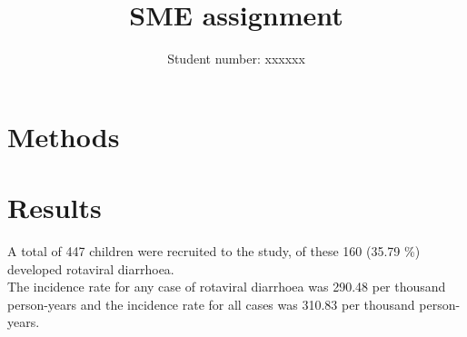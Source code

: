 \documentclass[11pt,a4paper,twoside]{article}\usepackage{graphicx, color}
\title{SME assignment}
\author{Student number: xxxxxx}
\makeatletter
\newenvironment{kframe}{%
 \def\at@end@of@kframe{}%
 \ifinner\ifhmode%
  \def\at@end@of@kframe{\end{minipage}}%
  \begin{minipage}{\columnwidth}%
 \fi\fi%
 \def\FrameCommand##1{\hskip\@totalleftmargin \hskip-\fboxsep
 \colorbox{shadecolor}{##1}\hskip-\fboxsep
     \hskip-\linewidth \hskip-\@totalleftmargin \hskip\columnwidth}%
 \MakeFramed {\advance\hsize-\width
   \@totalleftmargin\z@ \linewidth\hsize
   \@setminipage}}%
 {\par\unskip\endMakeFramed%
 \at@end@of@kframe}
\makeatother
\begin{document}
\section{Methods}
\begin{kframe}


{\ttfamily\noindent\color{warningcolor}{\#\# Warning: package 'foreign' was built under R version 2.15.3}}\end{kframe}


\section{Results}
A total of 447 children were recruited to the study, of these 160 (35.79 \%) developed rotaviral diarrhoea. \\
The incidence rate for any case of rotaviral diarrhoea was 290.48 per thousand person-years and the incidence rate for all cases was 310.83 per thousand person-years.\\ 
\end{document}
